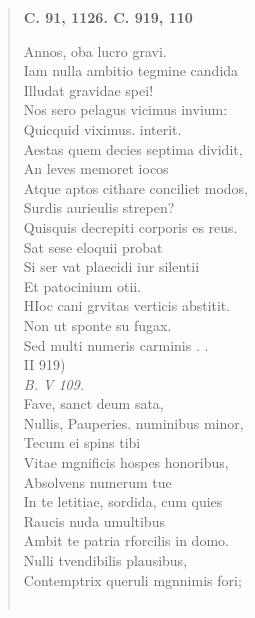 \documentclass[11pt, a4paper]{report}
\begin{document}
\begin{verse}
     \marginpar{[345]} \begin{center} \textbf{C. 91, 1126. C. 919, 110} \end{center}Annos, oba lucro gravi. \\  \lbrack Iam nulla \rbrack  ambitio tegmine candida \\ Illudat gravidae spei! \\ Nos sero pelagus vicimus invium: \\ Quicquid viximus. interit. \\ Aestas quem decies septima dividit, \\ An leves memoret iocos \\ Atque aptos cithare conciliet modos, \\ Surdis aurieulis strepen? \\ Quisquis decrepiti corporis es reus. \\ Sat sese eloquii probat \\ Si ser \lbrack vat \rbrack  plaecidi iur silentii \\ Et patocinium otii. \\ HIoc cani grvitas verticis abstitit. \\ Non ut sponte su fugax. \\ Sed multi numeris carminis . . \\ II 919) \\ \textit{B. V 109.} \\ Fave, sanct deum sata, \\ Nullis, Pauperies. numinibus minor, \\ Tecum ei spins tibi \\ Vitae mgnificis hospes honoribus, \\ Absolvens numerum tue \\ In te letitiae, sordida, cum quies \\ Raucis nuda umultibus \\ Ambit te patria rforcilis in domo. \\ Nulli tvendibilis plausibus, \\ Contemptrix queruli mgnnimis fori; \\ 
        ﻿\pagebreak 

\end{verse}
\end{document}
